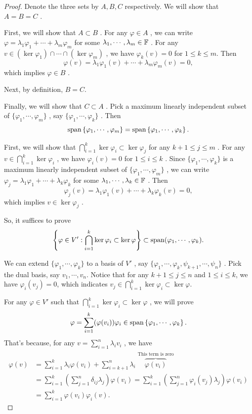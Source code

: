 \documentclass{article}
\begin{document}
\begin{proof}
	Denote the three sets by \( A,B,C \) respectively. We will show that \( A=B=C \) .\par
	First, we will show that \( A\subset B \) . For any \( \varphi\in A \) , we can write \( \varphi=\lambda_1\varphi_1+\cdots+\lambda_m\varphi_m \) for some \( \lambda_1,\cdots,\lambda_m\in\mathbb{F} \) . For any \( v\in (\ker \varphi_1) \cap \cdots \cap (\ker \varphi_m) \) , we have \( \varphi_k(v)=0 \) for \( 1\le k\le m \). Then
	\[ \varphi(v)=\lambda_1\varphi_1(v)+\cdots+\lambda_m\varphi_m(v)=0, \] 
	which implies \( \varphi\in B \) .\par
	Next, by definition, \( B=C \). \par
	Finally, we will show that \( C\subset A \) . Pick a maximum linearly independent subset of \( \{\varphi_1,\cdots,\varphi_m\} \) , say \( \{\varphi_1,\cdots,\varphi_k\} \) . Then
	\[ \operatorname{span} \left\{\varphi_1,\cdots,\varphi_m\right\}=\operatorname{span} \left\{\varphi_1,\cdots,\varphi_k\right\}. \] \par
	First, we will show that \( \bigcap_{i=1}^{k}\ker \varphi_i \subset \ker \varphi_j \) for any \( k+1\le j\le m \) . For any \( v\in \bigcap_{i=1}^{k}\ker \varphi_i \) , we have \( \varphi_i(v)=0 \) for \( 1\le i\le k \) . Since \( \{\varphi_1,\cdots,\varphi_k\} \) is a maximum linearly independent subset of \( \{\varphi_1,\cdots,\varphi_m\} \) , we can write \( \varphi_j=\lambda_1\varphi_1+\cdots+\lambda_k\varphi_k \) for some \( \lambda_1,\cdots,\lambda_k\in\mathbb{F} \) . Then
	\[ \varphi_j(v)=\lambda_1\varphi_1(v)+\cdots+\lambda_k\varphi_k(v)=0, \]
	which implies \( v\in \ker \varphi_j \) .\par
	So, it suffices to prove
	\[ \left\{\varphi\in V':\bigcap_{i=1}^{k}\ker \varphi_i\subset\ker\varphi\right\}\subset\operatorname{span}(\varphi_1,\cdots,\varphi_k). \] \par
	We can extend \( \{\varphi_1,\cdots,\varphi_k\} \) to a basis of \( V' \) , say \( \{\varphi_1,\cdots,\varphi_k,\psi_{k+1},\cdots,\psi_n\} \) . Pick the dual basis, say \( v_1,\cdots,v_n \). Notice that for any \( k+1\le j\le n \) and \( 1\le i\le k \), we have \( \varphi_i(v_j)=0 \), which indicates \( v_j\in\bigcap_{i=1}^{k}\ker \varphi_i\subset\ker \varphi \). \par
	For any \( \varphi\in V' \) such that \( \bigcap_{i=1}^{k}\ker \varphi_i\subset\ker\varphi \) , we will prove
	\[ \varphi=\sum_{i=1}^{k} (\varphi(v_i))\varphi_i\in\operatorname{span} \left\{\varphi_1,\cdots,\varphi_k\right\}. \] 
	That's because, for any \( v=\sum_{i=1}^{n}\lambda_i v_i \) , we have
	\begin{align*}
		\varphi(v)
		&=\sum_{i=1}^{k}\lambda_i\varphi(v_i) +\sum_{i=k+1}^{n}\lambda_i\overbrace{\varphi(v_i)}^{\substack{\text{This term is zero}}}\\
		&=\sum_{i=1}^{k}\left(\sum_{j=1}^{n} \delta_{ij}\lambda_j\right)\varphi(v_i)
		=\sum_{i=1}^{k}\left(\sum_{j=1}^{n} \varphi_i(v_j)\lambda_j\right)\varphi(v_i)\\
		&=\sum_{i=1}^{k}\varphi(v_i)\varphi_i(v).
	\end{align*}
\end{proof}
\end{document}
